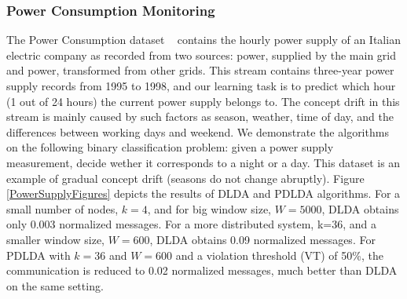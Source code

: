 \documentclass{sig-alternate-05-2015}
\begin{document}
\subsubsection{Power Consumption Monitoring}
The Power Consumption dataset ~\cite{powerSupply} contains the hourly power supply of an
Italian electric company as recorded from two sources: power, supplied
by the main grid and power, transformed from other grids.
This stream contains three-year power supply records
from 1995 to 1998, and our learning task is to predict which hour (1 out of 24 hours) the current power supply belongs to. The concept drift in this stream
is mainly caused by such factors as season, weather, time of day,
and the differences between working days and weekend.
We demonstrate the algorithms on the following binary classification problem:
given a power supply measurement, decide wether it corresponds to a night or a day.
This dataset is an example of gradual concept drift (seasons do not
change abruptly).
Figure \ref{PowerSupplyFigures} depicts the results of DLDA
and PDLDA algorithms. For a small number of nodes, $k=4$, and for big
window size, $W=5000$, DLDA obtains only 0.003 normalized messages. 
For a more distributed system, k=36, and a smaller window
size, $W=600$, DLDA obtains 0.09 normalized messages. For PDLDA with
$k=36$ and $W=600$ and a violation threshold (VT) of 50\%, the communication
is reduced to 0.02 normalized messages, much better than DLDA on the same setting.
\end{document}
